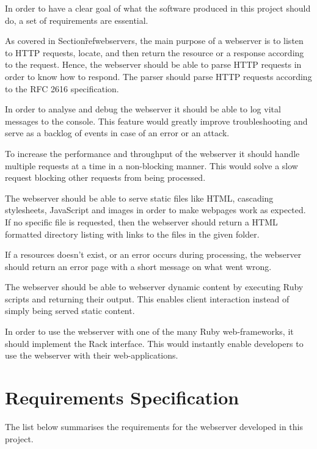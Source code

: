 
In order to have a clear goal of what the software produced in this project
should do, a set of requirements are essential. 

As covered in Section\~ref{webservers}, the main purpose of a webserver is to
listen to HTTP requests, locate, and then return the resource or a response
according to the request. Hence, the webserver should be able to parse HTTP
requests in order to know how to respond. The parser should parse HTTP
requests according to the RFC 2616 specification.

In order to analyse and debug the webserver it should be able to log vital
messages to the console. This feature would greatly improve troubleshooting
and serve as a backlog of events in case of an error or an attack.

To increase the performance and throughput of the webserver it should handle
multiple requests at a time in a non-blocking manner. This would solve a slow
request blocking other requests from being processed.

The webserver should be able to serve static files like HTML, cascading
stylesheets, JavaScript and images in order to make webpages work as expected.
If no specific file is requested, then the webserver should return a HTML
formatted directory listing with links to the files in the given folder.

If a resources doesn't exist, or an error occurs during processing, the
webserver should return an error page with a short message on what went wrong.

The webserver should be able to webserver dynamic content by executing Ruby
scripts and returning their output. This enables client interaction instead of
simply being served static content.

In order to use the webserver with one of the many Ruby web-frameworks, it
should implement the Rack interface. This would instantly enable developers to
use the webserver with their web-applications.

\section{Requirements Specification}
\label{req_spec}
The list below summarises the requirements for the webserver developed in this
project.

